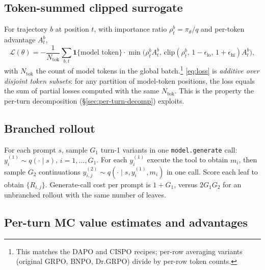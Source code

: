 \documentclass[11pt,a4paper]{article}
\begin{document}
\subsection{Token-summed clipped surrogate}

For trajectory $b$ at position $t$, with importance ratio
$\rho^b_t = \pi_\theta / q$ and per-token advantage $A^b_t$,
\begin{equation}
\mathcal{L}(\theta) =
 -\frac{1}{N_{\text{tok}}}\sum_{b,t}
   \mathbf{1}\{\text{model token}\}\cdot
   \min\!\big(\rho^b_t A^b_t,\,\mathrm{clip}(\rho^b_t,\,1-\epsilon_{\text{lo}},\,1+\epsilon_{\text{hi}}) A^b_t\big),
\label{eq:loss}
\end{equation}
with $N_{\text{tok}}$ the count of model tokens in the global batch.\footnote{This
matches the DAPO and CISPO recipes; per-row averaging variants
(original GRPO, BNPO, Dr.GRPO) divide by per-row token counts.}
\eqref{eq:loss} is \emph{additive over disjoint token subsets}: for
any partition of model-token positions, the loss equals the sum of
partial losses computed with the same $N_{\text{tok}}$. This is the
property the per-turn decomposition (\S\ref{sec:per-turn-decomp}) exploits.

\subsection{Branched rollout}

For each prompt $s$, sample $G_1$ turn-1 variants in one
\texttt{model.generate} call:
$y^{(1)}_i \sim q(\cdot\mid s)$, $i=1,\dots,G_1$. For each $y^{(1)}_i$
execute the tool to obtain $m_i$, then sample $G_2$ continuations
$y^{(2)}_{i,j} \sim q(\cdot\mid s, y^{(1)}_i, m_i)$ in one call. Score
each leaf to obtain $\{R_{i,j}\}$. Generate-call cost per prompt is
$1+G_1$, versus $2G_1 G_2$ for an unbranched rollout with the same
number of leaves.

\subsection{Per-turn MC value estimates and advantages}
\end{document}
